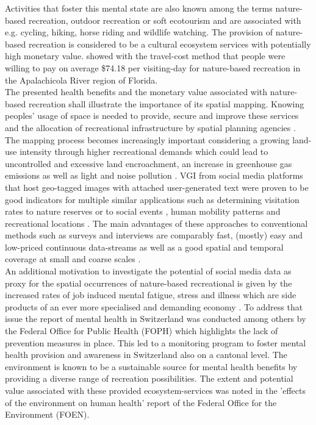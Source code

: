 Activities that foster this mental state are also known among the terms nature-based recreation, outdoor recreation or soft ecotourism \parencite{Deng2002, Balmford2009} and are associated with e.g. cycling, hiking, horse riding and wildlife watching. The provision of nature-based recreation is considered to be a cultural ecosystem services \parencite{Weyland2014, Richards2018, Yoshimura2017} with potentially high monetary value. \textcite{Shrestha2007} showed with the travel-cost method that people were willing to pay on average \$74.18 per visiting-day for nature-based recreation in the Apalachicola River region of Florida. \\
The presented health benefits and the monetary value associated with nature-based recreation shall illustrate the importance of its spatial mapping. Knowing peoples' usage of space is needed to provide, secure and improve these services and the allocation of recreational infrastructure by spatial planning agencies \parencite{Sen2014}. The mapping process becomes increasingly important considering a growing land-use intensity through higher recreational demands which could lead to uncontrolled and excessive land encroachment, an increase in greenhouse gas emissions as well as light and noise pollution \parencite{Song2018}.
VGI from social media platforms that host geo-tagged images with attached user-generated text were proven to be good indicators for multiple similar applications such as determining visitation rates to nature reserves \parencite{Tenkanen2017, Heikinheimo2017, Keeler2015, Wood2013} or to social events \parencite{Pettersson2011}, human mobility patterns \parencite{Barchiesi2015, Grossenbacher2014} and recreational locations \parencite{Weyland2014, Hill2006, Neuvonen2010}. The main advantages of these approaches to conventional methods such as surveys and interviews are comparably fast, (mostly) easy and low-priced \parencite{Richards2018} continuous data-streams as well as a good spatial and temporal coverage at small \parencite{Buckee2015b} and coarse scales \parencite{Weyland2014}. \\
An additional motivation to investigate the potential of social media data as proxy for the spatial occurrences of nature-based recreational is given by the increased rates of job induced mental fatigue, stress and illness which are side products of an ever more specialised and demanding economy \parencite{Trenberth2002}. To address that issue the report of mental health in Switzerland \parencite{Ruesch2003} was conducted among others by the Federal Office for Public Health (FOPH) which highlights the lack of prevention measures in place. This led to a monitoring program to foster mental health provision and awareness in Switzerland \parencite{Schuler2012} also on a cantonal level. The environment is known to be a sustainable source for mental health benefits by providing a diverse range of recreation possibilities. The extent and potential value associated with these provided ecosystem-services was noted in the 'effects of the environment on human health' report \parencite{Ragettli2017} of the Federal Office for the Environment (FOEN).

